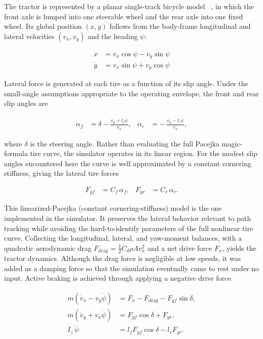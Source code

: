 The tractor is represented by a planar single-track bicycle model ~\cite{rajamani2011vehicle}, in which the front axle is lumped into one steerable wheel and the rear axle into one fixed wheel. Its
global position $(x,y)$ follows from the body-frame longitudinal and lateral velocities
$(v_x, v_y)$ and the heading $\psi$:

\begin{align}
    \dot{x} &= v_x \cos\psi - v_y \sin\psi \label{eq:tractor_x} \\
    \dot{y} &= v_x \sin\psi + v_y \cos\psi \label{eq:tractor_y}
\end{align}

Lateral force is generated at each tire as a function of its slip angle. Under the
small-angle assumptions appropriate to the operating envelope, the front and rear slip
angles are

\begin{align}
    \alpha_f &= \delta - \frac{v_y + l_f \dot{\psi}}{v_x}, &
    \alpha_r &= -\,\frac{v_y - l_r \dot{\psi}}{v_x},
    \label{eq:slip}
\end{align}

where $\delta$ is the steering angle. Rather than evaluating the full Pacejka magic-formula
tire curve, the simulator operates in its linear region. For the modest slip angles
encountered here the curve is well approximated by a constant cornering stiffness, giving the
lateral tire forces

\begin{align}
    F_{yf} &= C_f\, \alpha_f, & F_{yr} &= C_r\, \alpha_r .
    \label{eq:tireforce}
\end{align}

This linearized-Pacejka (constant cornering-stiffness) model is the one implemented in the
simulator. It preserves the lateral behavior relevant to path tracking while avoiding the
hard-to-identify parameters of the full nonlinear tire curve. Collecting the longitudinal,
lateral, and yaw-moment balances, with a quadratic aerodynamic drag
$F_{\mathrm{drag}} = \tfrac{1}{2} C_d \rho A v_x^2$ and a net drive force $F_x$, yields the
tractor dynamics. Although the drag force is negligible at low speeds, it was added as a damping force so that the simulation eventually came to rest under no input. Active braking is achieved through applying a negative drive force. 

\begin{align}
    m\left(\dot{v}_x - v_y \dot{\psi}\right) &= F_x - F_{\mathrm{drag}} - F_{yf}\sin\delta,
    \label{eq:long}\\
    m\left(\dot{v}_y + v_x \dot{\psi}\right) &= F_{yf}\cos\delta + F_{yr},
    \label{eq:lat}\\
    I_z\, \ddot{\psi} &= l_f F_{yf}\cos\delta - l_r F_{yr}.
    \label{eq:yaw}
\end{align}

